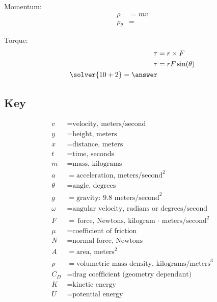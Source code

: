 \documentclass[10pt, letterpaper]{book}
\begin{document}
\begin{multicols*}{2}
        Momentum:
        \begin{align}
            \rho            & = mv          \\
            \rho_{\theta}   & =
        \end{align}

        Torque:
        \begin{align}
            \tau & = r \times F     \\
            \tau & = rF\sin(\theta) \\
            \solver{10+2} = \answer
        \end{align}
    \end{multicols*}

    \pagebreak

    \subsection*{Key}
    \begin{multicols}{2}
        \begin{align*}
            v       & = \text{velocity, meters/second}                                  \\
            y       & = \text{height, meters}                                           \\
            x       & = \text{distance, meters}                                         \\
            t       & = \text{time, seconds}                                            \\
            m       & = \text{mass, kilograms}                                          \\
            a       & = \text{acceleration, meters/second}^{2}                          \\
            \theta  & = \text{angle, degrees}                                           \\
            g       & = \text{gravity: 9.8 meters/second}^{2}                           \\
            \omega  & = \text{angular velocity, radians or degrees/second}              \\
            F       & = \text{force, Newtons, kilogram $\cdot$ meters/second}^{2}       \\
            \mu     & = \text{coefficient of friction}                                  \\
            N       & = \text{normal force, Newtons}                                    \\
            A       & = \text{area, meters}^{2}                                         \\
            \rho    & = \text{volumetric mass density, kilograms/meters}^{3}            \\
            C_{D}   & = \text{drag coefficient (geometry dependant)}                    \\
            K       & = \text{kinetic energy}                                           \\
            U       & = \text{potential energy}
        \end{align*}
    \end{multicols}
\end{document}
